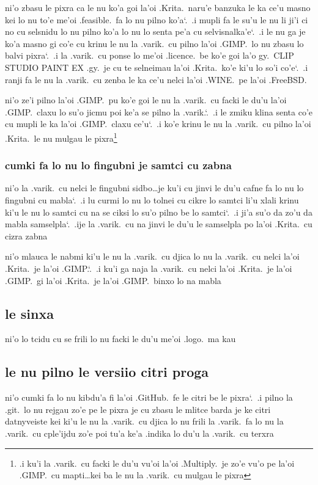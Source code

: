 \documentclass{report}
\newcommand\sds{\spacefactor\sfcode`.\ \space}
\begin{document}
ni'o zbasu le pixra ca le nu ko'a goi la'oi .Krita.\ naru'e banzuka le ka ce'u masno kei lo nu to'e me'oi .feasible.\ fa lo nu pilno ko'a\sds  .i mupli fa le su'u le nu li ji'i ci no cu selsnidu lo nu pilno ko'a lo nu lo senta pe'a cu selvisnalka'e\sds  .i le nu ga je ko'a masno gi co'e cu krinu le nu la .varik.\ cu pilno la'oi .GIMP.\ lo nu zbasu lo balvi pixra\sds  .i la .varik.\ cu ponse lo me'oi .licence.\ be ko'e goi la'o gy.\ CLIP STUDIO PAINT EX .gy.\ je cu te selneimau la'oi .Krita.\ ko'e ki'u lo so'i co'e\sds  .i ranji fa le nu la .varik.\ cu zenba le ka ce'u nelci la'oi .WINE.\ pe la'oi .FreeBSD.

ni'o ze'i pilno la'oi .GIMP.\ pu ko'e goi le nu la .varik.\ cu facki le du'u la'oi .GIMP.\ claxu lo su'o jicmu poi ke'a se pilno la .varik.\sds  .i le zmiku klina senta co'e cu mupli le ka la'oi .GIMP.\ claxu ce'u\sds  .i ko'e krinu le nu la .varik.\ cu pilno la'oi .Krita.\ le nu mulgau le pixra\footnote{.i ku'i la .varik.\ cu facki le du'u vu'oi la'oi .Multiply.\ je zo'e vu'o pe la'oi .GIMP.\ cu mapti\ldots kei ba le nu la .varik.\ cu mulgau le pixra}

\subsubsection{cumki fa lo nu lo fingubni je samtci cu zabna}
ni'o la .varik.\ cu nelci le fingubni sidbo\ldots je ku'i cu jinvi le du'u cafne fa lo nu lo fingubni cu mabla\sds  .i lu curmi lo nu lo tolnei cu cikre lo samtci li'u xlali krinu ki'u le nu lo samtci cu na se ciksi lo su'o pilno be lo samtci\sds  .i ji'a su'o da zo'u da mabla samselpla\sds  .ije la .varik.\ cu na jinvi le du'u le samselpla po la'oi .Krita.\ cu cizra zabna

ni'o mlauca le nabmi ki'u le nu la .varik.\ cu djica lo nu la .varik.\ cu nelci la'oi .Krita.\ je la'oi .GIMP.\sds  .i ku'i ga naja la .varik.\ cu nelci la'oi .Krita.\ je la'oi .GIMP.\ gi la'oi .Krita.\ je la'oi .GIMP.\ binxo lo na mabla

\subsection{le sinxa}
ni'o lo tcidu cu se frili lo nu facki le du'u me'oi .logo.\ ma kau

\subsection{le nu pilno le versiio citri proga}
ni'o cumki fa lo nu kibdu'a fi la'oi .GitHub.\ fe le citri be le pixra\sds  .i pilno la .git.\ lo nu rejgau zo'e pe le pixra je cu zbasu le mlitce barda je ke citri datnyveiste kei ki'u le nu la .varik.\ cu djica lo nu frili la .varik.\ fa lo nu la .varik.\ cu cple'ijdu zo'e poi tu'a ke'a .indika lo du'u la .varik.\ cu terxra
\end{document}
